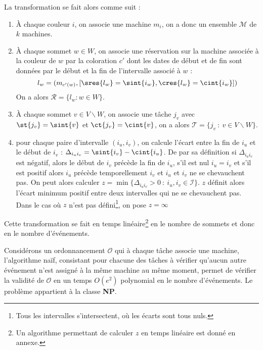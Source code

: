 \documentclass[a4paper,9pt]{report}
\begin{document}
La transformation se fait alors comme suit : 
\begin{enumerate}
    \item À chaque couleur $i$, on associe une machine $m_i$, on a donc un ensemble
        $\mathcal{M}$ de $k$ machines.
    \item À chaque sommet $w \in W$, on associe une réservation sur la machine associée à la
        couleur de $w$ par la coloration $c'$ dont les dates de début et de fin sont données par
        le début et la fin de l'intervalle associé à $w$ : \[
            l_w = (m_{c'(w)}, [\sres{l_w} = \sint{i_w}, \cres{l_w} = \cint{i_w}])
        \]
        On a alors $\mathcal{R} = \{l_w : w \in W\}$.
    \item À chaque sommet $v \in V \backslash W$, on associe une tâche $j_v$ avec $\st{j_v} =
        \sint{v}$ et $\ct{j_v} = \cint{v}$, on a alors $\mathcal{T} = \{j_v\ \colon\ v \in V
        \backslash W\}$.
    \item pour chaque paire d'intervalle $(i_u, i_v)$, on calcule l'écart entre la fin de $i_u$ et
        le début de $i_v$ : $\Delta_{i_ui_v} = \sint{i_v} - \cint{i_u}$. De par sa définition si
        $\Delta_{i_ui_v}$ est négatif, alors le début de $i_v$ précède la fin de $i_u$, s'il est nul
        $i_u = i_v$ et s'il est positif alors $i_u$ précède temporellement $i_v$ et $i_u$ et $i_v$
        ne se chevauchent pas. On peut alors calculer $z = \min\{\Delta_{i_ui_v} > 0\ :\ i_u, i_v
        \in \mathcal{I}\}$. $z$ définit alors l'écart minimum positif entre deux intervalles qui ne
        se chevauchent pas.
        Dans le cas où $z$ n'est pas
        défini\footnote{Tous les intervalles s'intersectent, où les écarts sont tous nuls.}, on
        pose $z = \infty$
\end{enumerate}

Cette transformation se fait en temps linéaire\footnote{Un algorithme permettant de calculer $z$ en
temps linéaire est donné en annexe.} en le nombre de sommets et donc en le nombre
d'événements.

Considérons un ordonnancement $\mathcal{O}$ qui à chaque tâche associe une machine, l'algorithme
naïf, consistant pour chacune des tâches à vérifier qu'aucun autre événement n'est assigné à la
même machine au même moment, permet de vérifier la validité de $\mathcal{O}$ en un temps
$O(e^2)$ polynomial en le nombre d'événements. Le problème \fischedpi appartient à la classe
\textbf{NP}.
\end{document}
